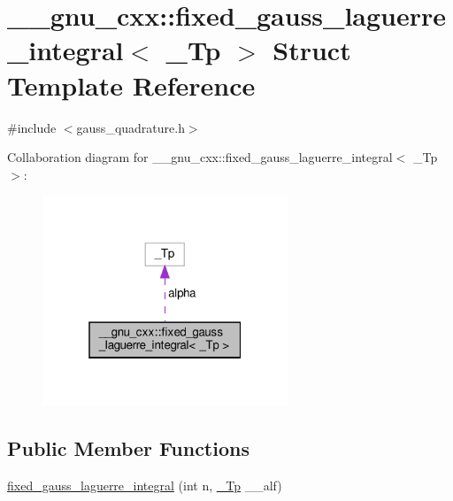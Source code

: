 \hypertarget{struct____gnu__cxx_1_1fixed__gauss__laguerre__integral}{}\section{\+\_\+\+\_\+gnu\+\_\+cxx\+:\+:fixed\+\_\+gauss\+\_\+laguerre\+\_\+integral$<$ \+\_\+\+Tp $>$ Struct Template Reference}
\label{struct____gnu__cxx_1_1fixed__gauss__laguerre__integral}


{\ttfamily \#include $<$gauss\+\_\+quadrature.\+h$>$}



Collaboration diagram for \+\_\+\+\_\+gnu\+\_\+cxx\+:\+:fixed\+\_\+gauss\+\_\+laguerre\+\_\+integral$<$ \+\_\+\+Tp $>$\+:
\nopagebreak
\begin{figure}[H]
\begin{center}
\leavevmode
\includegraphics[width=208pt]{struct____gnu__cxx_1_1fixed__gauss__laguerre__integral__coll__graph}
\end{center}
\end{figure}
\subsection*{Public Member Functions}
\begin{DoxyCompactItemize}
\item 
\hyperlink{struct____gnu__cxx_1_1fixed__gauss__laguerre__integral_ac17e6a5bc1b597c0cda245a47ed1053a}{fixed\+\_\+gauss\+\_\+laguerre\+\_\+integral} (int n, \hyperlink{namespace____gnu__cxx_a3b19a9c800ca194374ef9172290f7d79}{\+\_\+\+Tp} \+\_\+\+\_\+alf)
\end{DoxyCompactItemize}
